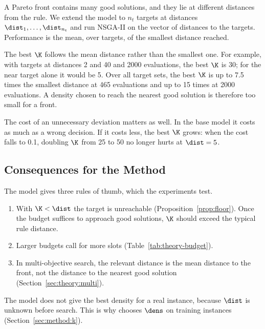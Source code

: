 A Pareto front contains many good solutions, and they lie at different distances from the rule.
We extend the model to $n_t$ targets at distances $\dist_1, \dots, \dist_{n_t}$ and run NSGA-II on the vector of distances to the targets.
Performance is the mean, over targets, of the smallest distance reached.

The best $\K$ follows the mean distance rather than the smallest one.
For example, with targets at distances 2 and 40 and 2000 evaluations, the best $\K$ is 30;
for the near target alone it would be 5.
Over all target sets, the best $\K$ is up to 7.5 times the smallest distance at 465 evaluations and up to 15 times at 2000 evaluations.
A density chosen to reach the nearest good solution is therefore too small for a front.

The cost of an unnecessary deviation matters as well.
In the base model it costs as much as a wrong decision.
If it costs less, the best $\K$ grows: when the cost falls to 0.1, doubling $\K$ from 25 to 50 no longer hurts at $\dist = 5$.

\subsection{Consequences for the Method}
\label{sec:theory:consequences}

The model gives three rules of thumb, which the experiments test.
\begin{enumerate}
  \item With $\K < \dist$ the target is unreachable (Proposition~\ref{prop:floor}).
  Once the budget suffices to approach good solutions, $\K$ should exceed the typical rule distance.
  \item Larger budgets call for more slots (Table~\ref{tab:theory-budget}).
  \item In multi-objective search, the relevant distance is the mean distance to the front, not the distance to the nearest good solution (Section~\ref{sec:theory:multi}).
\end{enumerate}
The model does not give the best density for a real instance, because $\dist$ is unknown before search.
This is why \SDD chooses $\dens$ on training instances (Section~\ref{sec:method:k}).

